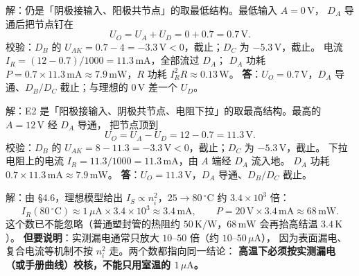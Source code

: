 \documentclass[11pt]{ctexart}
\begin{document}


解：仍是「阴极接输入、阳极共节点」的取最低结构。最低输入 $A=0\,\mathrm{V}$，
$D_A$ 导通后把节点钉在
\[
U_O=U_A+U_D=0+0.7=0.7\,\mathrm{V}.
\]
校验：$D_B$ 的 $U_{AK}=0.7-4=-3.3\,\mathrm{V}<0$，截止；$D_C$ 为 $-5.3\,\mathrm{V}$，截止。
电流 $I_R=(12-0.7)/1000=11.3\,\mathrm{mA}$，全部流过 $D_A$；
$D_A$ 功耗 $P=0.7\times11.3\,\mathrm{mA}\approx7.9\,\mathrm{mW}$，$R$ 功耗 $I_R^2R\approx0.13\,\mathrm{W}$。
\textbf{答}：$U_O=0.7\,\mathrm{V}$，$D_A$ 导通、$D_B/D_C$ 截止；与理想的 $0\,\mathrm{V}$ 差一个 $U_D$。



解：E2 是「阳极接输入、阴极共节点、电阻下拉」的取最高结构。最高的 $A=12\,\mathrm{V}$ 经 $D_A$ 导通，
把节点顶到
\[
U_O=U_A-U_D=12-0.7=11.3\,\mathrm{V}.
\]
校验：$D_B$ 的 $U_{AK}=8-11.3=-3.3\,\mathrm{V}<0$，截止；$D_C$ 为 $-5.3\,\mathrm{V}$，截止。
下拉电阻上的电流 $I_R=11.3/1000=11.3\,\mathrm{mA}$，由 $A$ 端经 $D_A$ 流入地。
$D_A$ 功耗 $0.7\times11.3\,\mathrm{mA}\approx7.9\,\mathrm{mW}$。
\textbf{答}：$U_O=11.3\,\mathrm{V}$，$D_A$ 导通、$D_B/D_C$ 截止。



解：由 §4.6，理想模型给出 $I_S\propto n_i^2$，$25\to80\,{}^\circ\mathrm{C}$ 约 $3.4\times10^3$ 倍：
\[
I_R(80\,{}^\circ\mathrm{C})\approx1\,\mu\mathrm{A}\times3.4\times10^{3}
\approx3.4\,\mathrm{mA},
\qquad
P=20\,\mathrm{V}\times3.4\,\mathrm{mA}\approx68\,\mathrm{mW}.
\]
这个数已不能忽略（普通塑封管的热阻约 $50\,\mathrm{K/W}$，$68\,\mathrm{mW}$ 会再抬高结温 $3.4\,\mathrm{K}$）。
\textbf{但要说明}：实测漏电通常只放大 $10$--$50$ 倍（约 $10$--$50\,\mu\mathrm{A}$），
因为表面漏电、复合电流等机制不按 $n_i^2$ 走。两个数都指向同一结论：
\textbf{高温下必须按实测漏电（或手册曲线）校核，不能只用室温的 $1\,\mu\mathrm{A}$。}
\end{document}
